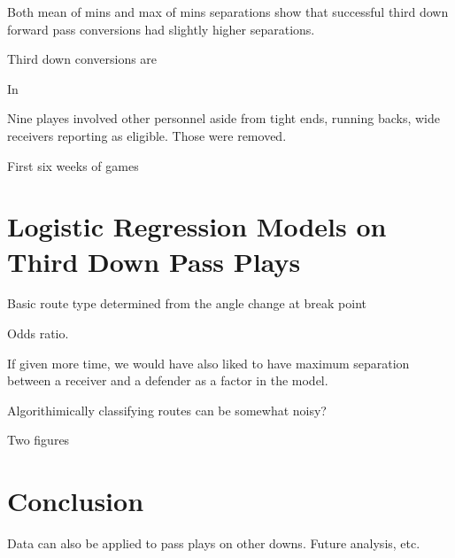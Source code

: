 \documentclass[12pt,letterpaper]{article}
\begin{document}
Both mean of mins and max of mins separations show that successful third down forward pass conversions had slightly higher separations.

Third down conversions are 

In

Nine playes involved other personnel aside from tight ends, running backs, wide receivers reporting as eligible. Those were removed.

First six weeks of games

\section*{Logistic Regression Models on Third Down Pass Plays}

Basic route type determined from the angle change at break point

Odds ratio.

If given more time, we would have also liked to have maximum separation between a receiver and a defender as a factor in the model.

Algorithimically classifying routes can be somewhat noisy?

Two figures

\section*{Conclusion}

Data can also be applied to pass plays on other downs. Future analysis, etc.
\end{document}
